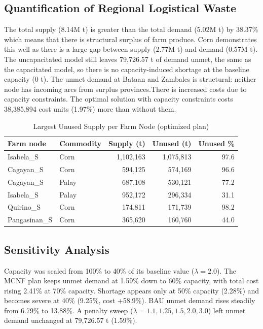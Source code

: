 \documentclass{icsthesis}
\begin{document}
\begin{mainmatter}
\subsection{Quantification of Regional Logistical Waste}
The total supply (8.14M t) is greater than the total demand (5.02M t) by 38.37\% which means that there is structural surplus of farm produce. Corn demonstrates this well as there is a large gap between supply (2.77M t) and demand (0.57M t). The uncapacitated model still leaves 79,726.57 t of demand unmet, the same as the capacitated model, so there is no capacity-induced shortage at the baseline capacity (0 t). The unmet demand at Bataan and Zambales is structural: neither node has incoming arcs from surplus provinces.There is increased costs due to capacity constraints. The optimal solution with capacity constraints costs 38,385,894 cost units (1.97\%) more than without them.



\begin{table}[htbp]
\caption{Largest Unused Supply per Farm Node (optimized plan)}
\centering
\small
\setlength{\tabcolsep}{2.5pt}
\begin{tabular}{llrrr}
\hline
Farm node & Commodity & Supply (t) & Unused (t) & Unused \% \\
\hline
Isabela\_S & Corn & 1,102,163 & 1,075,813 & 97.6 \\
Cagayan\_S & Corn & 594,125 & 574,169 & 96.6 \\
Cagayan\_S & Palay & 687,108 & 530,121 & 77.2 \\
Isabela\_S & Palay & 952,172 & 296,334 & 31.1 \\
Quirino\_S & Corn & 174,811 & 171,739 & 98.2 \\
Pangasinan\_S & Corn & 365,620 & 160,760 & 44.0 \\
\hline
\end{tabular}
\end{table}

\subsection{Sensitivity Analysis}
Capacity was scaled from 100\% to 40\% of its baseline value ($\lambda = 2.0$). The MCNF plan keeps unmet demand at 1.59\% down to 60\% capacity, with total cost rising 2.41\% at 70\% capacity. Shortage appears only at 50\% capacity (2.28\%) and becomes severe at 40\% (9.25\%, cost +58.9\%). BAU unmet demand rises steadily from 6.79\% to 13.88\%. A penalty sweep ($\lambda = 1.1, 1.25, 1.5, 2.0, 3.0$) left unmet demand unchanged at 79,726.57 t (1.59\%).


\end{mainmatter}
\end{document}
